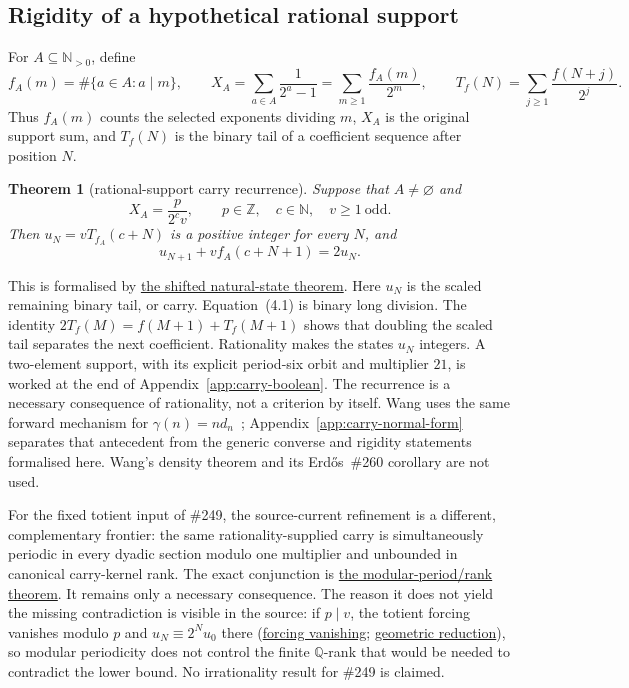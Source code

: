 \documentclass[11pt]{article}
\newcommand{\commit}{99f4bf47422abbd8757cbb22b50ba079d764d3a7}
\newcommand{\repobase}{https://github.com/wcook04/plectis-erdos/blob/\commit}
\newcommand{\PK}{Erdos249257}
\newcommand{\lword}[4]{\href{\repobase/\PK/#1\#L#2}{#4}}
\newtheorem{theorem}{Theorem}[section]
\theoremstyle{definition}
\theoremstyle{remark}
\newcommand{\N}{\mathbb{N}}
\newcommand{\Npos}{\mathbb{N}_{>0}}
\newcommand{\Z}{\mathbb{Z}}
\begin{document}
\subsection{Rigidity of a hypothetical rational support}

For \(A\subseteq\Npos\), define
\[
 f_A(m)=\#\{a\in A:a\mid m\},
 \qquad
 X_A=\sum_{a\in A}\frac1{2^a-1}
     =\sum_{m\geq1}\frac{f_A(m)}{2^m},
 \qquad
 T_f(N)=\sum_{j\geq1}\frac{f(N+j)}{2^j}.
\]
Thus \(f_A(m)\) counts the selected exponents dividing \(m\), \(X_A\) is the
original support sum, and \(T_f(N)\) is the binary tail of a coefficient
sequence after position \(N\).

\begin{theorem}[rational-support carry recurrence]\label{res:rigidity-main}
Suppose that \(A\neq\varnothing\) and
\[
 X_A=\frac{p}{2^c v},
 \qquad p\in\Z,\quad c\in\N,\quad v\geq1\ \text{odd}.
\]
Then \(u_N=vT_{f_A}(c+N)\) is a positive integer for every \(N\), and
\[
 u_{N+1}+v f_A(c+N+1)=2u_N. \tag{4.1}
\]
\end{theorem}
\noindent This is formalised by
\lword{RationalSupportCarrySkeleton.lean}{671}{exists_shifted_odd_tail_nat_states_of_support_fraction}{the shifted natural-state theorem}.
Here \(u_N\) is the scaled remaining binary tail, or carry.
Equation~\textup{(4.1)} is binary long division.  The identity
\(2T_f(M)=f(M+1)+T_f(M+1)\) shows that doubling the scaled tail separates the
next coefficient.  Rationality makes the states \(u_N\) integers.
A two-element
support, with its explicit period-six orbit and multiplier \(21\), is worked
at the end of Appendix~\ref{app:carry-boolean}.
The recurrence is a necessary consequence of rationality, not a criterion by
itself.  Wang uses the same forward mechanism for
\(\gamma(n)=n d_n\)~\cite[Proposition~3.1, pp.~5--6]{wang2026};
Appendix~\ref{app:carry-normal-form}
separates that antecedent from the generic converse and rigidity statements
formalised here.  Wang's density theorem and its Erd\H{o}s~\#260 corollary
are not used.

For the fixed totient input of \#249, the source-current refinement is a
different, complementary frontier: the same rationality-supplied carry is
simultaneously periodic in every dyadic section modulo one multiplier and
unbounded in canonical carry-kernel rank.  The exact conjunction is
\lword{TotientTailCarryPeriod.lean}{224}{not_irrational_totientSeries_implies_mod_period_and_unbounded_rank}{the modular-period/rank theorem}.
It remains only a necessary consequence.  The reason it does not yield the
missing contradiction is visible in the source: if $p\mid v$, the totient
forcing vanishes modulo $p$ and $u_N\equiv2^N u_0$ there
(\lword{TotientTailCarryPeriod.lean}{126}{totient_forcing_vanishes_mod_of_dvd_multiplier}{forcing vanishing};
\lword{TotientTailCarryPeriod.lean}{140}{totient_carry_modEq_geometric_of_dvd_multiplier}{geometric reduction}),
so modular periodicity does not control the finite $\mathbb Q$-rank that would
be needed to contradict the lower bound.  No irrationality result for \#249 is
claimed.
\end{document}
